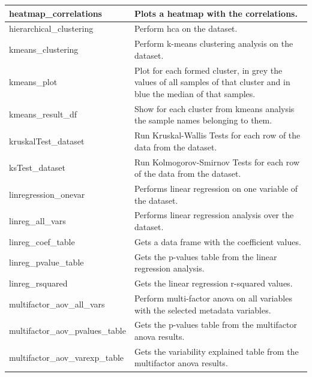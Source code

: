 \begin{scriptsize}
\begin{longtable}{|m{4.3cm}|m{11cm}|}
		\hline
		heatmap\_correlations & Plots a heatmap with the correlations. \\
		
		\hline
		hierarchical\_clustering & Perform \acrlong{hca} on the dataset. \\
		
		\hline
		kmeans\_clustering & Perform k-means clustering analysis on the dataset. \\
		
		\hline
		kmeans\_plot & Plot for each formed cluster, in grey the values of all samples of that cluster and in blue the median
		of that samples. \\
		
		\hline
		kmeans\_result\_df & Show for each cluster from kmeans analysis the sample names belonging to them. \\
		
		\hline
		kruskalTest\_dataset & Run Kruskal-Wallis Tests for each row of the data from the dataset. \\
		
		\hline
		ksTest\_dataset & Run Kolmogorov-Smirnov Tests for each row of the data from the dataset. \\
		
		\hline
		linregression\_onevar & Performs linear regression on one variable of the dataset. \\
		
		\hline
		linreg\_all\_vars & Performs linear regression analysis over the dataset. \\
		
		\hline
		linreg\_coef\_table & Gets a data frame with the coefficient values. \\
		
		\hline
		linreg\_pvalue\_table & Gets the p-values table from the linear regression analysis. \\
		
		\hline
		linreg\_rsquared & Gets the linear regression r-squared values. \\
		
		\hline
		multifactor\_aov\_all\_vars & Perform multi-factor \gls{anova} on all variables with the selected metadata variables. \\
		
		\hline
		multifactor\_aov\_pvalues\_table & Gets the p-values table from the multifactor \gls{anova} results. \\
		
		\hline
		multifactor\_aov\_varexp\_table & Gets the variability explained table from the multifactor \gls{anova} results. \\
		

\end{longtable}
\end{scriptsize}

